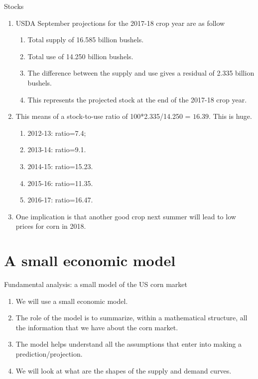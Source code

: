 \documentclass[table,xcolor=pdftex,dvipsnames, handout]{beamer}\usepackage[]{graphicx}\usepackage[]{color}
\begin{document}
\begin{frame}[allowframebreaks]{Stocks}
\begin{enumerate}[label=\textbullet]
  \item USDA September projections for the 2017-18 crop year are as follow
      \begin{enumerate}[label=-]
         \item Total supply of 16.585 billion bushels.
         \item Total use of 14.250 billion bushels.
         \item The difference between the supply and use gives a residual of 2.335 billion bushels.
         \item This represents the projected stock at the end of the 2017-18 crop year.
      \end{enumerate}  
  \item This means of a stock-to-use ratio of 100*2.335/14.250 = $16.39$. This is huge.
      \begin{enumerate}[label=-]
         \item 2012-13: ratio=7.4;
         \item 2013-14: ratio=9.1.
         \item 2014-15: ratio=15.23.
         \item 2015-16: ratio=11.35.
         \item 2016-17: ratio=16.47.
      \end{enumerate}
  \item One implication is that another good crop next summer will lead to low prices for corn in 2018.
\end{enumerate}
\end{frame}


\section{A small economic model}

\begin{frame}{Fundamental analysis: a small model of the US corn market}
\begin{enumerate}[label=\textbullet]
  \item We will use a small economic model.
  \item The role of the model is to summarize, within a mathematical structure, all the information that we have about the corn market.
  \item The model helps understand all the assumptions that enter into making a prediction/projection.
  \item We will look at what are the shapes of the supply and demand curves.
\end{enumerate}
\end{frame}
\end{document}
